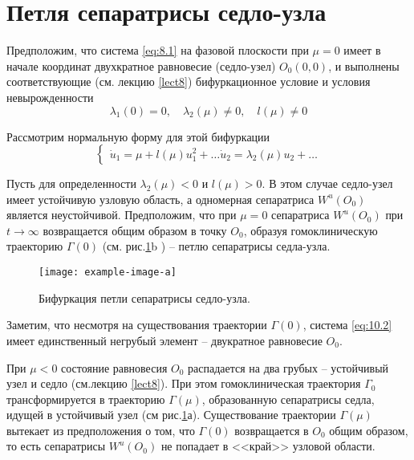 \section{Петля сепаратрисы седло-узла}%
\label{sec:10.1}

Предположим, что система \eqref{eq:8.1} на фазовой плоскости при $\mu=0$ имеет в начале координат двухкратное равновесие (седло-узел) $O_0(0,0)$, и выполнены соответствующие (см. лекцию \ref{lect8})
бифуркационное условие и условия невырожденности
\begin{equation}
        \label{eq:10.1}
        \lambda_1(0) = 0, \quad \lambda_2(\mu) \neq 0, \quad l(\mu) \neq 0
\end{equation}

Рассмотрим нормальную форму для этой бифуркации
\begin{equation}
        \label{eq:10.2}
        \begin{cases}
                \dot u_1 = \mu + l(\mu) u_1^2 + \dots 
                \dot u_2 = \lambda_2(\mu) u_2 + \dots
        \end{cases}
\end{equation}

Пусть для определенности $\lambda_2(\mu) < 0$ и $l(\mu) > 0$. В этом случае седло-узел
имеет устойчивую узловую область, а одномерная сепаратриса $W^u(O_0)$ 
является неустойчивой. Предположим, что при $\mu=0$ сепаратриса $W^u(O_0)$ при $t \to \infty$ возвращается общим образом в точку $O_0$, образуя гомоклиническую траекторию
$\Gamma(0)$ (см. рис.\ref{fig:10.1}b ) -- петлю сепаратрисы седла-узла.
\begin{figure}[h]
        \centering
        \texttt{[image: example-image-a]}
        \caption{Бифуркация петли сепаратрисы седло-узла.}
        \label{fig:10.1}
\end{figure}

Заметим, что несмотря на существования траектории $\Gamma(0)$, система \eqref{eq:10.2} имеет единственный негрубый элемент -- двукратное равновесие $O_0.$

При $\mu<0$ состояние равновесия $O_0$ распадается на два грубых -- устойчивый узел и 
седло (см.лекцию \ref{lect8}). При этом гомоклиническая траектория $\Gamma_0$ трансформируется в траекторию
$\Gamma(\mu)$, образованную сепаратрисы седла, идущей в устойчивый узел (см рис.\ref{fig:10.1}а). Существование траектории $\Gamma(\mu)$ вытекает из предположения о том, что $\Gamma(0)$ возвращается в $O_0$ общим  образом, то есть сепаратрисы $W^u(O_0)$ не попадает в <<край>> 
узловой области.

